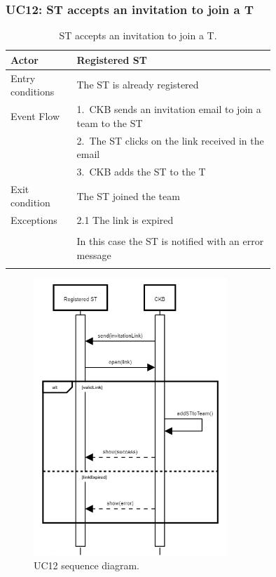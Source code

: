 \subsubsection*{UC12: ST accepts an invitation to join a T}
\begin{center}
  \begin{longtable}{l|p{0.75\linewidth}}
    \hline
    Actor & Registered ST \\
    \hline
    Entry conditions & The ST is already registered \\
    \hline
    Event Flow & 1.\ CKB sends an invitation email to join a team to the ST \\
    & 2.\ The ST clicks on the link received in the email \\
    & 3.\ CKB adds the ST to the T \\
    \hline
    Exit condition &  The ST joined the team \\
    \hline
    Exceptions & 2.1 The link is expired \\ \\
    & In this case the ST is notified with an error message \\
    \hline
    \caption{ST accepts an invitation to join a T.}
    \label{tab: ST_accepts_invitation}
  \end{longtable}

  \begin{figure} [H]
    \begin{center}
        \includegraphics[width=0.65\textwidth,height=\textheight,keepaspectratio]{Images/SequenceDiagrams/UC12.png}
        \caption{UC12 sequence diagram.}
        \label{fig: UC12_sequence_diagram}
    \end{center}
  \end{figure}
\end{center}


